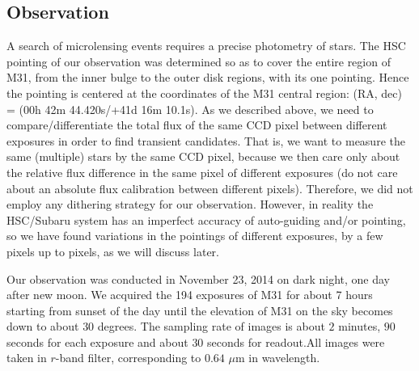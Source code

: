 \documentclass[iop, apj]{emulateapj}
\newcommand{\?}{\stackrel{?}{=}}
\begin{document}
\subsection{Observation}
\label{sec:obsm31}
A search of microlensing events requires a precise photometry of stars. 
The HSC pointing of our observation was determined so as to cover the entire region of M31, from the inner bulge to the outer disk regions, with its one pointing. Hence the pointing is centered at the coordinates of the M31 central region: (RA, dec) = (00h 42m 44.420s/+41d 16m 10.1s). 
As we described above, we need to compare/differentiate the total flux of the same CCD pixel between different exposures in order to find transient candidates. That is, we want to measure the same (multiple) stars by the same CCD pixel, because we then care only about the relative flux difference in the same pixel of different exposures (do not care about an absolute flux calibration between different pixels). Therefore, we did not employ any dithering strategy for our observation. However, in reality the HSC/Subaru system has an imperfect accuracy of auto-guiding and/or pointing, so we have found  variations in the pointings of different exposures, by a few pixels up to pixels, as we will discuss later. 

Our observation was conducted in November 23, 2014 on dark night, one day after new moon. We acquired the 194 exposures of M31 for about 7 hours starting from sunset of the day until the elevation of M31 on the sky becomes down to about $30$  degrees. The sampling rate of images is about $2$ minutes, $90$ seconds for each exposure and about $30$ seconds for readout.All images were taken in $r$-band filter, corresponding to $0.64$ $\mu$m in wavelength. 



\end{document}
